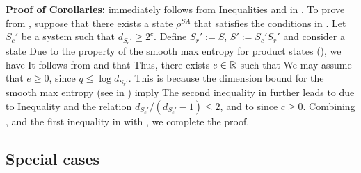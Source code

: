 \documentclass[journal]{IEEEtran}
\begin{document}
\noindent
{\bf Proof of Corollaries:}
 immediately follows from Inequalities  and  in .
To prove  from ,
suppose that there exists a state $\rho^{SA}$ that satisfies the conditions in .
Let $S_c'$ be a system such that $d_{S_c'}\geq2^c$.
Define $S_r':=S$, $S':=S_c'S_r'$ and
consider a state
Due to the property of the smooth max entropy for product states (), we have
It follows from  and  that
Thus, there exists $e\in{\mathbb R}$ such that
We may assume that $e\geq0$, since $q\leq \log{d_{S_r'}}$.
This is because the dimension bound for the smooth max entropy (see  in ) imply
The second inequality in  further leads to
due to Inequality  and the relation $d_{S_c'}/(d_{S_c'}-1)\leq2$,
and to 
since $c\geq0$.
Combining ,  and the first inequality in  with , we complete the proof.
\QED





\subsection{Special cases}
\end{document}
